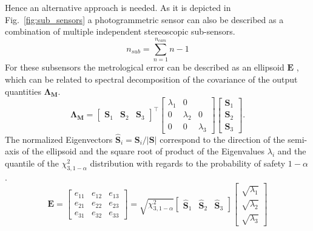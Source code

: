 \documentclass[5p,times,procedia]{elsarticle}
\begin{document}
%
Hence an alternative approach is needed. As it is depicted in  Fig.~\ref{fig:sub_sensors} a photogrammetric sensor can also be described as a combination of multiple independent stereoscopic sub-sensors.
%
\begin{equation}
	\label{eqn:CovarianceMatrix}
	n_{sub} = \sum_{n=1}^{n_{cam}}n-1
\end{equation}
%
For these subsensors the metrological error can be described as an ellipsoid $\mathbf{E}$ \cite{Luhmann2003}, which can be related to spectral decomposition of the covariance of the output quantities $\mathbf{\Lambda_{M}}$.
%
\begin{equation}
	\mathbf{\Lambda_{M}} =
	\begin{bmatrix}
		\mathbf{S}_1^{} & \mathbf{S}_2^{} & \mathbf{S}_3^{}
	\end{bmatrix}^{\top}
	\begin{bmatrix}
		\lambda_1^{} & 0 \\
		0 & \lambda_2^{} &  0 \\
		0 & 0 &  \lambda_3^{}
	\end{bmatrix}
	\begin{bmatrix}
		\mathbf{S}_1^{} \\
		\mathbf{S}_2^{} \\
		\mathbf{S}_3^{}
	\end{bmatrix}.
\end{equation}
%
The normalized Eigenvectors $\mathbf{\hat{S}}_i = \mathbf{S}_i / |\mathbf{S}|$ correspond to the direction of the semi-axis of the ellipsoid and the square root of product of the Eigenvalues $\lambda_i$ and the quantile of the $\chi^2_{3,1-\alpha} $ distribution with regards to the probability of safety $1-\alpha$ \cite{Pelzer1995}.
%
\begin{equation}
	\mathbf{E} =
	\begin{bmatrix}
		e_{11}^{} & e_{12}^{} & e_{13}^{} \\
		e_{21}^{} & e_{22}^{} & e_{23}^{} \\
		e_{31}^{} & e_{32}^{} & e_{33}^{}
	\end{bmatrix}
	=
	\sqrt{ \chi^2_{3,1-\alpha}}
	\begin{bmatrix}
		\mathbf{\hat{S}}_1^{} & \mathbf{\hat{S}}_2^{} & \mathbf{\hat{S}}_3^{}
	\end{bmatrix}
	\begin{bmatrix}
		\sqrt{\lambda_1^{}} \\
		\sqrt{\lambda_2^{}} \\
		\sqrt{\lambda_3^{}}
	\end{bmatrix}
\end{equation}
\end{document}
